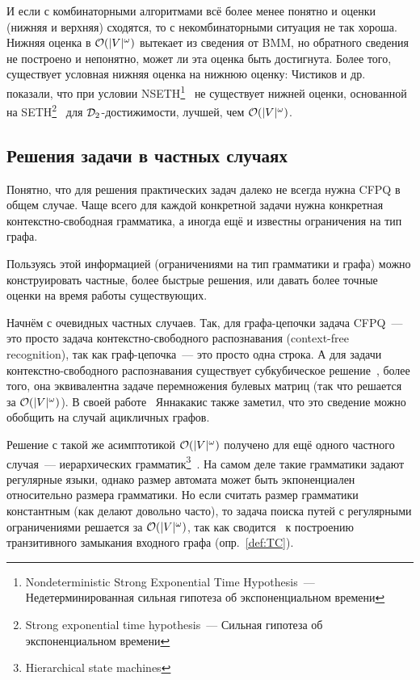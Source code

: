 И если с комбинаторными алгоритмами всё более менее понятно и оценки (нижняя и верхняя) сходятся, то с некомбинаторными ситуация не так хороша. Нижняя оценка в $\mathcal{O}(|V|^{\omega})$ вытекает из сведения от BMM, но обратного сведения не построено и непонятно, может ли эта оценка быть достигнута. Более того, существует условная нижняя оценка на нижнюю оценку: Чистиков и др.~\cite{Chistikov21} показали, что при условии NSETH\footnote{Nondeterministic Strong Exponential Time Hypothesis~--- Недетерминированная сильная гипотеза об экспоненциальном времени}~\cite{Carmosino16} не существует нижней оценки, основанной на SETH\footnote{Strong exponential time hypothesis~--- Сильная гипотеза об экспоненциальном времени}~\cite{Impagliazzo01} для $\mathcal{D}_2$-достижимости, лучшей, чем $\mathcal{O}(|V|^{\omega})$.

\subsection{Решения задачи в частных случаях}

Понятно, что для решения практических задач далеко не всегда нужна CFPQ в общем случае. Чаще всего для каждой конкретной задачи нужна конкретная контекстно-свободная грамматика, а иногда ещё и известны ограничения на тип графа.

Пользуясь этой информацией (ограничениями на тип грамматики и графа) можно конструировать частные, более быстрые решения, или давать более точные оценки на время работы существующих. 

Начнём с очевидных частных случаев. Так, для графа-цепочки задача CFPQ~--- это просто задача контекстно-свободного распознавания (context-free recognition), так как граф-цепочка~--- это просто одна строка. А для задачи контекстно-свободного распознавания существует субкубическое решение~\cite{Valiant1975}, более того, она эквивалентна задаче перемножения булевых матриц (так что решается за $\mathcal{O}(|V|^{\omega})$). В своей работе~\cite{Yannakakis1990} Яннакакис также заметил, что это сведение можно обобщить на случай ацикличных графов.

Решение с такой же асимптотикой $\mathcal{O}(|V|^{\omega})$ получено для ещё одного частного случая~--- иерархических грамматик\footnote{Hierarchical state machines}~\cite{Yannakakis00}. На самом деле такие грамматики задают регулярные языки, однако размер автомата может быть экпоненциален относительно размера грамматики. Но если считать размер грамматики константным (как делают довольно часто), то задача поиска путей с регулярными ограничениями решается за $\mathcal{O}(|V|^{\omega})$, так как сводится~\cite{Yannakakis1990} к построению транзитивного замыкания входного графа (опр.~\ref{def:TC}).

